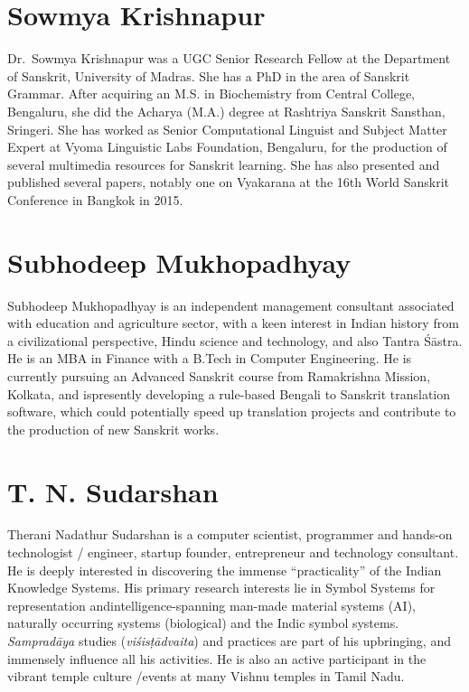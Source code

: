 \section*{Sowmya Krishnapur}

Dr.~Sowmya Krishnapur was a UGC Senior Research Fellow at the Department of Sanskrit, University of Madras. She has a PhD in the area of Sanskrit Grammar. After acquiring an M.S. in Biochemistry from Central College, Bengaluru, she did the Acharya (M.A.) degree at Rashtriya Sanskrit Sansthan, Sringeri. She has worked as Senior Computational Linguist and Subject Matter Expert at Vyoma Linguistic Labs Foundation, Bengaluru, for the production of several multimedia resources for Sanskrit learning. She has also presented and published several papers, notably one on Vyakarana at the 16th World Sanskrit Conference in Bangkok in 2015.

\section*{Subhodeep Mukhopadhyay}

Subhodeep Mukhopadhyay is an independent management consultant associated with education and agriculture sector, with a keen interest in Indian history from a civilizational perspective, Hindu science and technology, and also Tantra Śāstra. He is an MBA in Finance with a B.Tech in Computer Engineering. He is currently pursuing an Advanced Sanskrit course from Ramakrishna Mission, Kolkata, and is\break presently developing a rule-based Bengali to Sanskrit translation software, which could potentially speed up translation projects and contribute to the production of new Sanskrit works.


\section*{T. N. Sudarshan}

Therani Nadathur Sudarshan is a computer scientist, programmer and hands-on technologist / engineer, startup founder, entrepreneur and technology consultant. He is deeply interested in discovering the immense “practicality” of the Indian Knowledge Systems. His primary research interests lie in Symbol Systems for representation and\break intelligence-spanning man-made material systems (AI), naturally occurring systems (biological) and the Indic symbol systems. {\sl Sampradāya} studies ({\sl viśisṭādvaita}) and practices are part of his upbringing, and immensely influence all his activities. He is also an active participant in the vibrant temple culture /events at many Vishnu temples in Tamil Nadu.


